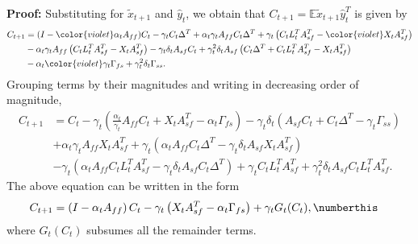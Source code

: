 \textbf{Proof:}
Substituting for $\tilde{x}_{t+1}$ and $\hat{y}_t$, we obtain that $C_{t+1} = \mathbb{E} \tilde{x}_{t+1} \hat{y}_t^T$ is given by
\begin{align*}
    C_{t+1} &= (I - {\color{violet}\alpha_t A_{ff}}) C_t 
    - \gamma_t C_t \Delta^T
    + \alpha_t \gamma_t A_{ff} C_t \Delta^T
    + \gamma_t \left(C_t L_t^T A_{sf}^T - {\color{violet}X_t A_{sf}^T} \right)     
    \\ 
    &
    - \alpha_t \gamma_t A_{ff}     \left(C_t L_t^T A_{sf}^T - X_t A_{sf}^T \right) 
    - \gamma_t \delta_t A_{sf} C_t
    + \gamma_t^2 \delta_t A_{sf} \left(C_t \Delta^T + C_t L_t^T A_{sf}^T - X_t A_{sf}^T\right) 
    \\ &
    - \alpha_t {\color{violet}\gamma_t \Gamma_{fs}} + \gamma_t^2 \delta_t \Gamma_{ss} .
\end{align*}
Grouping terms by their magnitudes and writing in decreasing order of magnitude,
\begin{align*}
    C_{t+1} 
    &= C_t - \gamma_t \left( \frac{\alpha_t}{\gamma_t} A_{ff} C_t + X_t A_{sf}^T - \alpha_t \Gamma_{fs}
    \right)
    - \gamma_t \delta_t \left( A_{sf} C_t + C_t \Delta^T - \gamma_t \Gamma_{ss}\right) 
    \\ &
    + \alpha_t \gamma_t A_{ff} X_t A_{sf}^T
    +
    \gamma_t \left(\alpha_t A_{ff} C_t \Delta^T - \gamma_t \delta_t A_{sf} X_t A_{sf}^T\right) 
    \\ &
    - \gamma_t \left(\alpha_t A_{ff} C_t L_t^T A_{sf}^T - \gamma_t \delta_t A_{sf} C_t \Delta^T\right) 
    + \gamma_t C_t L_t^T A_{sf}^T 
    + \gamma_t^2 \delta_t A_{sf} C_t L_t^T A_{sf}^T . 
\end{align*}
The above equation can be written in the form
\begin{align*}
    C_{t+1} &= \left(I - \alpha_t A_{ff} \right) C_t - \gamma_t \left(X_t A_{sf}^T - \alpha_t \Gamma_{fs}\right)
    + \gamma_t G_t (C_t) 
    , \numberthis \label{eq:joint_recursion}
\end{align*}
where $G_t (C_t)$ subsumes all the remainder terms. 
